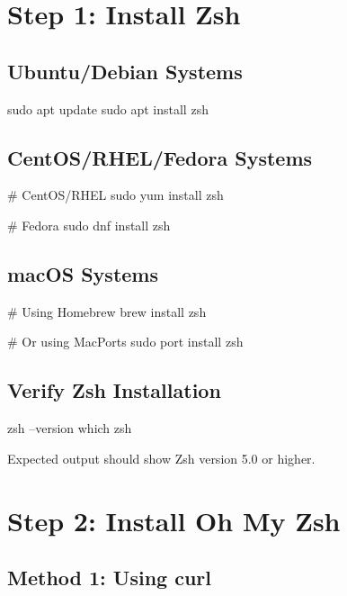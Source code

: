 \documentclass{article}
\begin{document}
\section{Step 1: Install Zsh}

\subsection{Ubuntu/Debian Systems}

\begin{codebox}
sudo apt update
sudo apt install zsh
\end{codebox}

\subsection{CentOS/RHEL/Fedora Systems}

\begin{codebox}
\# CentOS/RHEL
sudo yum install zsh

\# Fedora
sudo dnf install zsh
\end{codebox}

\subsection{macOS Systems}

\begin{codebox}
\# Using Homebrew
brew install zsh

\# Or using MacPorts
sudo port install zsh
\end{codebox}

\subsection{Verify Zsh Installation}

\begin{codebox}
zsh --version
which zsh
\end{codebox}

Expected output should show Zsh version 5.0 or higher.

\section{Step 2: Install Oh My Zsh}

\subsection{Method 1: Using curl}
\end{document}
